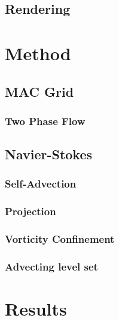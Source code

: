 \documentclass[]{report}   %
\begin{document}
\section{Rendering}


\chapter{Method}
\section{MAC Grid}

\subsection{Two Phase Flow}

\section{Navier-Stokes}
\subsection{Self-Advection}

\subsection{Projection}

\subsection{Vorticity Confinement}

\subsection{Advecting level set}


\chapter{Results}



\endgroup



\end{document}
